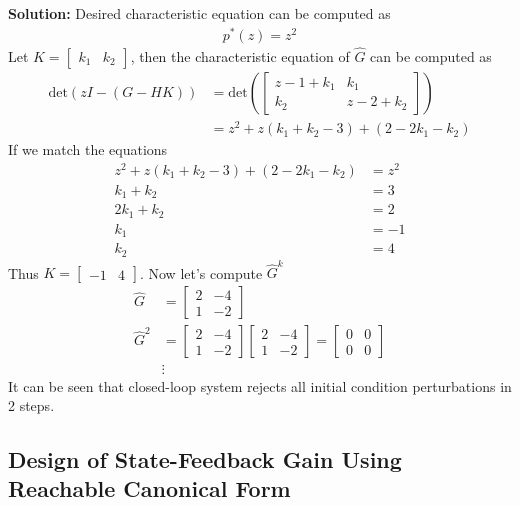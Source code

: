 \documentclass[twoside]{article}
\begin{document}
\textbf{Solution:} Desired characteristic equation can be computed as
%
\begin{align*}
  p^*(z) = z^2
\end{align*}
%
Let $K = \left[ \begin{array}{cc} k_1 & k_2 \end{array} \right]$, then
the characteristic equation of $\hat{G}$ can be computed as
%
\begin{align*}
  \mathrm{det} \left( z I - ( G - H K ) \right) &= 
  \mathrm{det} \left(
  \left[ \begin{array}{cc} z - 1 + k_1 & k_1 \\ k_2 & z - 2 + k_2 \end{array} \right]
  \right)
\\
&= z^2 + z (k_1 + k_2 - 3) + (2 -2 k_1 - k_2)
\end{align*}
%
If we match the equations
%
\begin{align*}
z^2 + z (k_1 + k_2 - 3) + (2 -2 k_1 - k_2) &= z^2
\\
k_1 + k_2 &= 3
\\
2k_1 + k_2 &= 2
\\
k_1 &= -1
\\
k_2 &= 4
\end{align*}
%
Thus $K = \left[ \begin{array}{cc} -1 & 4 \end{array} \right]$.
Now let's compute $\hat{G}^k$ 
%
\begin{align*}
\hat{G} &= \left[ \begin{array}{cc} 2 & -4 \\ 1 & -2 \end{array} \right] 
\\
\hat{G}^2 &= \left[ \begin{array}{cc} 2 & -4 \\ 1 & -2 \end{array} \right] 
\left[ \begin{array}{cc} 2 & -4 \\ 1 & -2 \end{array} \right] = 
\left[ \begin{array}{cc} 0 & 0 \\ 0 & 0 \end{array} \right]
\\
&\vdots
\end{align*}
%
It can be seen that closed-loop system rejects all initial condition
perturbations in 2 steps. 

\subsection*{Design of State-Feedback Gain Using Reachable Canonical
Form}
\end{document}
